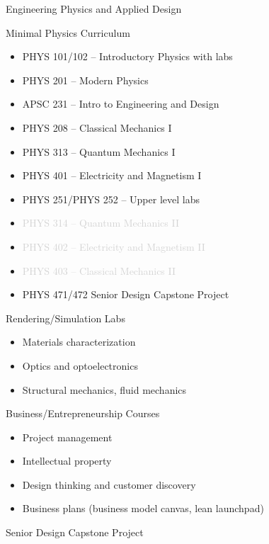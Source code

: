 \documentclass[xcolor={dvipsnames},professionalfonts]{beamer}
\begin{document}
\begin{frame}[allowframebreaks]{Engineering Physics and Applied Design}
 \begin{block}{Minimal Physics Curriculum}
  \begin{itemize}
   \item PHYS 101/102 – Introductory Physics with labs
   \item PHYS 201 – Modern Physics
   \item \alert{APSC 231 – Intro to Engineering and Design}
   \item PHYS 208 – Classical Mechanics I
   \item PHYS 313 – Quantum Mechanics I
   \item PHYS 401 – Electricity and Magnetism I
   \item PHYS 251/PHYS 252 – Upper level labs
   \item \textcolor{lightgray}{PHYS 314 – Quantum Mechanics II}
   \item \textcolor{lightgray}{PHYS 402 –  Electricity and Magnetism II}
   \item \textcolor{lightgray}{PHYS 403 – Classical Mechanics II}
   \item \alert{PHYS 471/472 Senior Design Capstone Project}
  \end{itemize}
 \end{block}
 \begin{block}{Rendering/Simulation Labs}
  \begin{itemize}
   \item Materials characterization
   \item Optics and optoelectronics
   \item Structural mechanics, fluid mechanics
  \end{itemize}
 \end{block}
 \begin{block}{Business/Entrepreneurship Courses}
  \begin{itemize}
   \item Project management
   \item Intellectual property
   \item Design thinking and customer discovery
   \item Business plans (business model canvas, lean launchpad)
  \end{itemize}
 \end{block}
 \begin{block}{Senior Design Capstone Project}

\end{block}
\end{frame}
\end{document}
